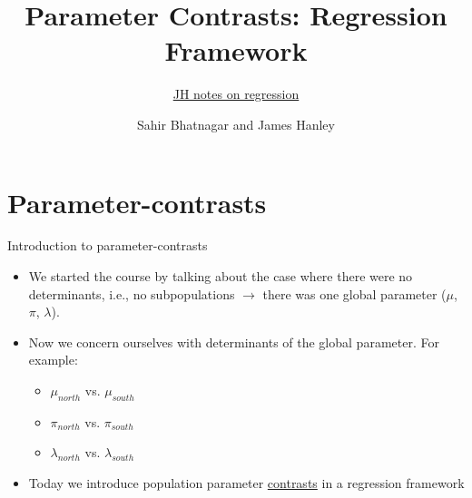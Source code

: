 \documentclass[handout]{beamer}\usepackage[]{graphicx}\usepackage[]{color}
\begin{document}




\title{Parameter Contrasts: Regression Framework}
\subtitle{\href{https://www.dropbox.com/s/1l3i59rw1qsnmsz/EPIB607introToRegression.pdf?dl=0}{JH notes on regression}}
\author{Sahir Bhatnagar and James Hanley}


\maketitle

\section{Parameter-contrasts}

\begin{frame}{Introduction to parameter-contrasts}

\begin{itemize}
	\setlength\itemsep{2em}
	\item We started the course by talking about the case where there were no determinants, i.e., no subpopulations $\to$ there was one global parameter ($\mu$, $\pi$, $\lambda$). \pause 
	\item Now we concern ourselves with determinants of the global parameter. For example:
	\begin{itemize}
		\item $\mu_{north}$ vs. $\mu_{south}$
		\item $\pi_{north}$ vs. $\pi_{south}$
		\item $\lambda_{north}$ vs. $\lambda_{south}$
	\end{itemize}
	\pause 
	\item Today we introduce population parameter \underline{contrasts} in a regression framework
	
\end{itemize}

\end{frame}
\end{document}
